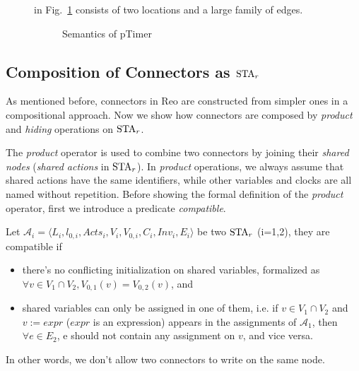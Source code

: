 \begin{description}
    \item[] in Fig.~\ref{fig:pTimer} consists of two locations and a large family of edges.
        \begin{figure}[H]
            \centering
            \resizebox{.8\textwidth}{!}{
                
            }
            \caption{Semantics of pTimer}
            \label{fig:pTimer}
        \end{figure}
\end{description}

\subsection{Composition of Connectors as $\mbox{STA}_r$}

As mentioned before, connectors in Reo are constructed from simpler ones in a compositional approach. Now we show how connectors are composed by \emph{product} and \emph{hiding} operations on $\mbox{STA}_r$.


The \emph{product} operator is used to combine two connectors by joining their \emph{shared nodes} (\emph{shared actions} in $\mbox{STA}_r$). In \emph{product} operations, we always assume that shared actions have the same identifiers, while other variables and clocks are all named without repetition. Before showing the formal definition of the \emph{product} operator, first we introduce a predicate \emph{compatible}.

\begin{definition}
    Let $\mathscr{A}_{i}=\langle L_{i}, l_{0,i}, Acts_{i}, V_{i}, V_{0,i}, C_{i}, Inv_{i}, E_{i} \rangle$ be two $\mbox{STA}_r$ (i=1,2), they are compatible if
    \begin{itemize}
        \item there's no conflicting initialization on shared variables, formalized as $\forall v\in V_1\cap V_2, V_{0,1}(v) = V_{0,2}(v)$, and
        \item shared variables can only be assigned in one of them, i.e. if $v\in V_1\cap V_2$ and $v:=expr$ ($expr$ is an expression) appears in the assignments of $\mathscr{A}_1$, then $\forall e\in E_2$, e should not contain any assignment on $v$, and vice versa.
    \end{itemize}
    In other words, we don't allow two connectors to write on the same node. 
\end{definition}

